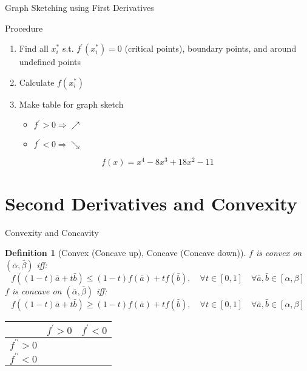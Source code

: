 \documentclass[a4paper,11pt]{article}
\newtheorem{defn}{Definition}
\begin{document}
\begin{frame}[t]{Graph Sketching using First Derivatives}
	\begin{block}{Procedure}
		\begin{enumerate}[(STEP 1)]
			\item Find all $x_i^\ast$ s.t. $f^\prime (x_i^\ast)=0$ (critical points), boundary points, and around undefined points
			\item Calculate $f(x_i^\ast)$
			\item Make table for graph sketch
			\begin{itemize}
				\item $f^\prime >0 \Rightarrow \nearrow$
				\item $f^\prime <0 \Rightarrow \searrow$
			\end{itemize}
		\end{enumerate}
	\end{block}
	\[
		f(x) = x^4 -8x^3 + 18x^2 - 11 \tag{Ex3.1}
	\]
\end{frame}


\section{Second Derivatives and Convexity} %
\label{sec:second_derivatives}

\begin{frame}[t]{Convexity and Concavity}
	\begin{defn}
		[Convex (Concave up), Concave (Concave down)]
		$f$ is convex on $(\bar \alpha, \bar \beta)$ iff:
		\[
			f\left((1-t)\bar a + t \bar b \right)\le (1-t)f(\bar a)+ tf(\bar b),\quad \forall t\in [0,1] \quad\forall \bar a, \bar b \in [\alpha,\beta]
		\]
		$f$ is concave on $(\bar \alpha, \bar \beta)$ iff:
		\[
			f\left((1-t)\bar a + t \bar b \right) \ge (1-t)f(\bar a)+ tf(\bar b),\quad \forall t\in [0,1] \quad\forall \bar a, \bar b \in [\alpha,\beta]
		\]
	\end{defn}
	\begin{center}
		\begin{tabular}{c|c|c}
		&	$f^\prime >0 $& $f^\prime<0$	\\
		\hline\hline
		$f^{\prime\prime}>0$&	&\\
		\hline
		$f^{\prime\prime}<0$&&\\
		\end{tabular}
	\end{center}
\end{frame}
\end{document}
